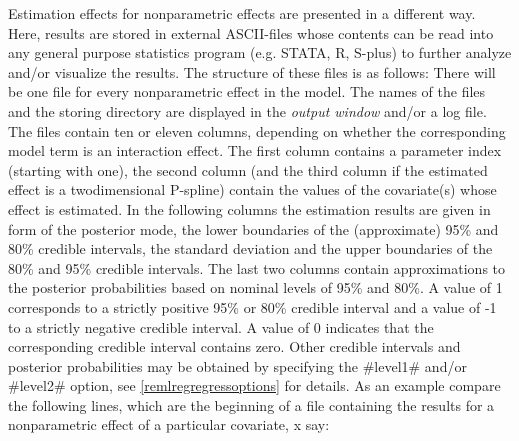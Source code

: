 Estimation effects for nonparametric effects are presented in a
different way. Here, results are stored in external ASCII-files
whose contents can be read into any general purpose statistics
program (e.g. STATA, R, S-plus) to further analyze and/or visualize
the results. The structure of these files is as follows: There will
be one file for every nonparametric effect in the model. The names
of the files and the storing directory are displayed in the {\em
output window} and/or a log file. The files contain ten or eleven
columns, depending on whether the corresponding model term is an
interaction effect. The first column contains a parameter index
(starting with one), the second column (and the third column if the
estimated effect is a twodimensional P-spline) contain the values of
the covariate(s) whose effect is estimated. In the following columns
the estimation results are given in form of the posterior mode, the
lower boundaries of the (approximate) 95\% and 80\% credible
intervals, the standard deviation and the upper boundaries of the
80\% and 95\% credible intervals. The last two columns contain
approximations to the posterior probabilities based on nominal
levels of 95\% and 80\%. A value of 1 corresponds to a strictly
positive 95\% or 80\% credible interval and a value of -1 to a
strictly negative credible interval. A value of 0 indicates that the
corresponding credible interval contains zero. Other credible
intervals and posterior probabilities may be obtained by specifying
the #level1# and/or #level2# option, see
\autoref{remlregregressoptions} for details. As an example compare
the following lines, which are the beginning of a file containing
the results for a nonparametric effect of a particular covariate, x
say:

